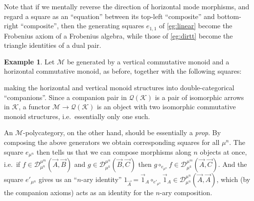 \documentclass{article}
\theoremstyle{definition}
\newtheorem{eg}{Example}
\def\M{\mathcal{M}}
\def\K{\mathcal{K}}
\def\Q{\mathcal{Q}}
\def\DD#1#2{\mathcal{D}^{#1}_{#2}}
\def\twocell#1#2#3{\ar[from=#1,to=#2,phantom,""{name=1,near start},""{name=2,near end}]\ar[Rightarrow,from=1,to=2,"#3"]}
\def\drtwocell{\twocell{r}{d}}
\begin{document}
Note that if we mentally reverse the direction of horizontal mode morphisms, and regard a square as an ``equation'' between its top-left ``composite'' and bottom-right ``composite'', then the generating squares $e_{1,1}$ of \cref{eg:linear} become the Frobenius axiom of a Frobenius algebra, while those of \cref{eg:dirtt} become the triangle identities of a dual pair.

\begin{eg}\label{eg:prop}
  Let $\M$ be generated by a vertical commutative monoid and a horizontal commutative monoid, as before, together with the following squares:
  making the horizontal and vertical monoid structures into double-categorical ``companions''.
  Since a companion pair in $\Q(\K)$ is a pair of isomorphic arrows in $\K$, a functor $\M\to\Q(\K)$ is an object with two isomorphic commutative monoid structures, i.e.\ essentially only one such.

  An $\M$-polycategory, on the other hand, should be essentially a \emph{prop}.
  By composing the above generators we obtain corresponding squares for all $\mu^n$.
  The square $e_{\mu^n}$ then tells us that we can compose morphisms along $n$ objects at once, i.e.\ if $f\in\DD{\mu^m}{\mu^n}(\vec{A},\vec{B})$ and $g\in \DD{\mu^n}{\mu^k}(\vec{B},\vec{C})$ then $g\circ_{e_{\mu^n}} f \in \DD{\mu^m}{\mu^k}(\vec{A},\vec{C})$.
  And the square $e'_{\mu^n}$ gives us an ``$n$-ary identity'' $1_{\vec{A}} = \vec{1}_A \circ_{e'_{\mu^n}} \vec{1}_A\in\DD{\mu^n}{\mu^n}(\vec{A},\vec{A})$, which (by the companion axioms) acts as an identity for the $n$-ary composition.
\end{eg}
\end{document}

